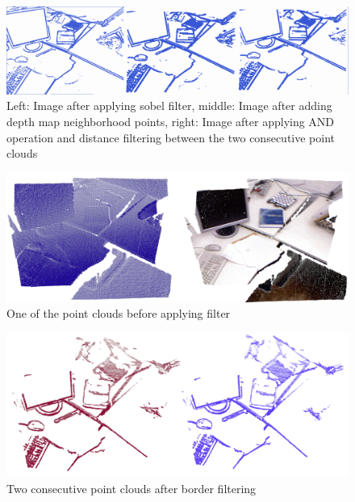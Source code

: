 \begin{figure}[H]
\begin{center}
\includegraphics[scale=0.2]{images/borders_steps.png}
\caption{Left: Image after applying sobel filter, middle: Image after adding depth map neighborhood points, right: Image after
applying AND operation and distance filtering between the two consecutive point clouds}
\end{center}
\end{figure}


\begin{figure}[H]
\begin{center}
\includegraphics[scale=0.3]{images/borders_orig.png}
\caption{One of the point clouds before applying filter}
\end{center}
\end{figure}


\begin{figure}[H]
\begin{center}
\includegraphics[scale=0.3]{images/borders_consec.png}
\caption{Two consecutive point clouds  after border filtering}
\end{center}
\end{figure}

